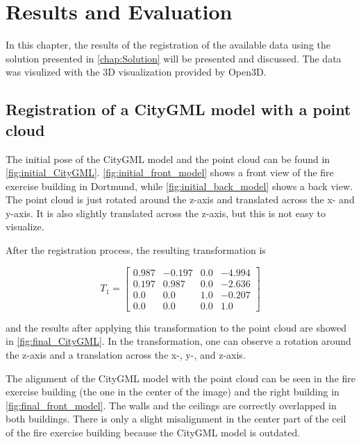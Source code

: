 

    \chapter{Results and Evaluation}

    In this chapter, the results of the registration of the available data using the solution presented in \autoref{chap:Solution} will be presented and discussed.
    The data was visulized with the 3D visualization provided by Open3D.    

    \section{Registration of a CityGML model with a point cloud}
        The initial pose of the CityGML model and the point cloud can be found in \autoref{fig:initial_CityGML}.
        \autoref{fig:initial_front_model} shows a front view of the fire exercise building in Dortmund, while \autoref{fig:initial_back_model} shows a back view.
        The point cloud is just rotated around the z-axis and translated across the x- and y-axis.
        It is also slightly translated across the z-axis, but this is not easy to visualize.

        After the registration process, the resulting transformation is

        \begin{equation*}
            T_1 = 
            \begin{bmatrix}0.987 & -0.197 & 0.0 & -4.994 \\ 
                0.197 & 0.987 & 0.0 & -2.636 \\
                0.0 & 0.0 & 1.0 & -0.207 \\
                0.0 & 0.0 & 0.0 & 1.0
            \end{bmatrix}
        \end{equation*}

        and the results after applying this transformation to the point cloud are showed in \autoref{fig:final_CityGML}.
        In the transformation, one can observe a rotation around the z-axis and a translation across the x-, y-, and z-axis.

        The alignment of the CityGML model with the point cloud can be seen in the fire exercise building (the one in the center of the image)
        and the right building in \autoref{fig:final_front_model}. The walls and the ceilings are correctly overlapped in both buildings.
        There is only a slight misalignment in the center part of the ceil of the fire exercise building because the CityGML model is outdated.

